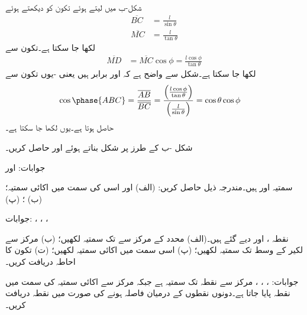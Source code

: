 شکل-ب میں  لیتے ہوئے تکون    کو دیکھتے ہوئے
\begin{align*}
\overline{BC}&=\frac{l}{\sin \theta}   \\
\overline{MC}&=\frac{l}{\tan \theta} 
\end{align*}
لکھا جا سکتا ہے۔تکون  سے
\begin{align*}
\overline{MD}&=\overline{MC} \cos \phi=\frac{l \cos \phi}{\tan \theta} 
\end{align*} 
لکھا جا سکتا ہے۔شکل سے واضح ہے کہ  اور  برابر ہیں یعنی -یوں تکون  سے
\begin{align*}
\cos \phase{ABC}&=\frac{\overline{AB}}{\overline{BC}}=\frac{\left(\frac{l \cos \phi}{\tan \theta}\right)}{\left(\frac{l}{\sin \theta}\right)}=\cos \theta \cos \phi
\end{align*}
حاصل ہوتا ہے۔یوں  لکھا جا سکتا ہے۔

شکل -ب کے طرز پر شکل بناتے ہوئے  اور  حاصل کریں۔

جوابات: اور 

\newpage


سمتیہ  اور  ہیں۔مندرجہ ذیل حاصل کریں: (الف)  اور اسی کی سمت میں اکائی سمتیہ؛ (ب) ؛ (پ) 

جوابات: ، ، ، 

نقطہ ،  اور  دیے گئے ہیں۔(الف) محدد کے مرکز سے  تک سمتیہ لکھیں؛ (ب) مرکز سے لکیر  کے وسط تک سمتیہ لکھیں؛ (پ) اسی سمت میں اکائی سمتیہ لکھیں؛ (ت) تکون  کا احاطہ دریافت کریں۔

جوابات: ، ، ،  
مرکز سے نقطہ  تک سمتیہ  ہے جبکہ مرکز سے  اکائی سمتیہ کی سمت میں نقطہ  پایا جاتا ہے۔دونوں نقطوں کے درمیان  فاصلہ  ہونے کی صورت میں نقطہ  دریافت کریں۔

